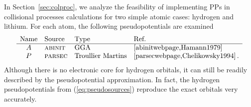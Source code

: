 \documentclass[10pt]{article}
\begin{document}
In Section~\ref{sec:colproc}, we analyze the feasibility of 
implementing PPs in collisional processes calculations for two 
simple atomic cases: hydrogen and lithium. For each atom, the 
following pseudopotentials are examined
\begin{equation}
 \begin{array}{clll}
  \mbox{Name} & \mbox{Source} & \mbox{Type} & \mbox{Ref.} \\
  \hline  
  A & \mbox{\sc abinit} & \mbox{GGA} & \cite{abinitwebpage,Hamann1979} \\
  P & \mbox{\sc parsec} & \mbox{Troullier Martins} & \cite{parsecwebpage,Chelikowsky1994}\,.
 \end{array}
 \label{eq:pseudosources}
\end{equation}
Although there is no electronic core for hydrogen orbitals, it
can still be readily described by the pseudopotential 
approximation. In fact, the hydrogen pseudopotentials from 
(\ref{eq:pseudosources}) reproduce the exact orbitals very 
accurately.
\end{document}

